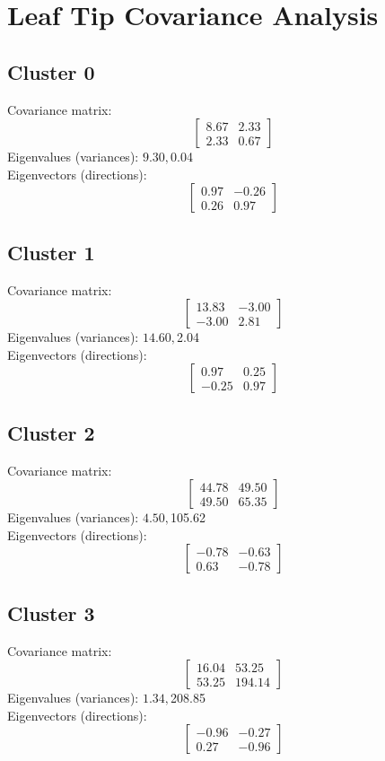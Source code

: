 \documentclass{article}
\begin{document}
\section*{Leaf Tip Covariance Analysis}
\subsection*{Cluster 0}
Covariance matrix:
\[\begin{bmatrix}8.67 & 2.33 \\2.33 & 0.67\end{bmatrix}\]
Eigenvalues (variances): $ 9.30, $0.04\\
Eigenvectors (directions):
\[\begin{bmatrix}0.97 & -0.26 \\0.26 & 0.97\end{bmatrix}\]
\subsection*{Cluster 1}
Covariance matrix:
\[\begin{bmatrix}13.83 & -3.00 \\-3.00 & 2.81\end{bmatrix}\]
Eigenvalues (variances): $ 14.60, $2.04\\
Eigenvectors (directions):
\[\begin{bmatrix}0.97 & 0.25 \\-0.25 & 0.97\end{bmatrix}\]
\subsection*{Cluster 2}
Covariance matrix:
\[\begin{bmatrix}44.78 & 49.50 \\49.50 & 65.35\end{bmatrix}\]
Eigenvalues (variances): $ 4.50, $105.62\\
Eigenvectors (directions):
\[\begin{bmatrix}-0.78 & -0.63 \\0.63 & -0.78\end{bmatrix}\]
\subsection*{Cluster 3}
Covariance matrix:
\[\begin{bmatrix}16.04 & 53.25 \\53.25 & 194.14\end{bmatrix}\]
Eigenvalues (variances): $ 1.34, $208.85\\
Eigenvectors (directions):
\[\begin{bmatrix}-0.96 & -0.27 \\0.27 & -0.96\end{bmatrix}\]
\end{document}
